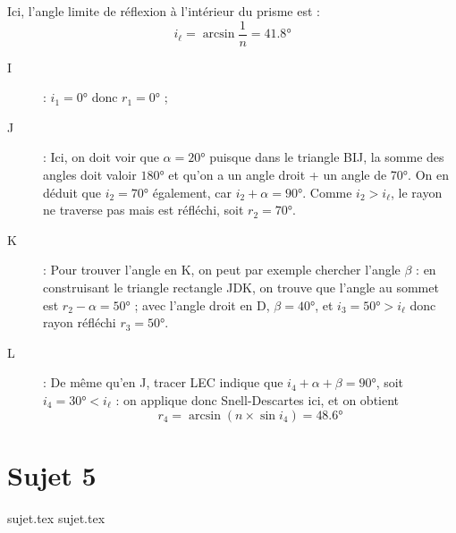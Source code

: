 \documentclass[a4paper, 10pt]{book}
\begin{document}
{\begin{tcb}[sidebyside]
		Ici, l'angle limite de réflexion à l'intérieur du prisme est : \[i_\ell =
			\arcsin \frac{1}{n} = \boxed{ \ang{41.8;;}}\]
		\begin{description}
			\item[I] : $\boxed{i_1 = \ang{0;;}}$ donc
				$\boxed{r_1 = \ang{0;;}}$ ;
			\item[J] : Ici, on doit voir que $\alpha = \ang{20;;}$ puisque
				dans le triangle BIJ, la somme des angles doit valoir $\ang{180;;}$
				et qu'on a un angle droit + un angle de \ang{70;;}.
				On en déduit que $\boxed{i_2 = \ang{70;;}}$ également, car
				$i_2 + \alpha = \ang{90;;}$.\smallbreak
				Comme \underline{$i_2 > i_\ell$}, le rayon ne traverse pas mais est
				réfléchi, soit $\boxed{r_2 = \ang{70;;}}$.
		\end{description}
		\tcblower
		\begin{description}
			\item[K] : Pour trouver l'angle en K, on peut par exemple chercher
				l'angle $\beta$ : en construisant le triangle rectangle JDK, on
				trouve que l'angle au sommet est $r_2 - \alpha = \ang{50;;}$ ;
				avec l'angle droit en D, $\beta = \ang{40;;}$, et $\boxed{i_3
						= \ang{50;;} > i_\ell}$ donc rayon réfléchi $\boxed{r_3 =
						\ang{50;;}}$.
			\item[L] : De même qu'en J, tracer LEC indique que $i_4 + \alpha + \beta
					= \ang{90;;}$, soit $\boxed{i_4 = \ang{30;;} < i_\ell}$
				: on applique donc Snell-Descartes ici, et on obtient
				\[\boxed{r_4} = \arcsin (n\times \sin i_4) =
					\boxed{\ang{48.6;;}}\]
		\end{description}
	\end{tcb}
}

\resetQ
\newpage

\chapter{Sujet 5}

{sujet.tex}
\resetQ
{sujet.tex}
\end{document}
